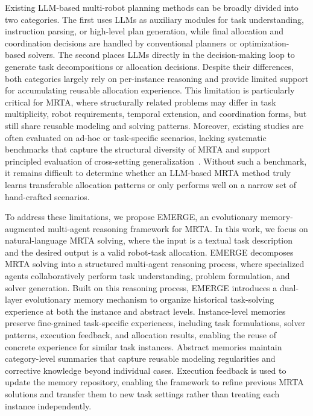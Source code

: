 \documentclass[letterpaper,journal]{IEEEtran}
\begin{document}
Existing LLM-based multi-robot planning methods can be broadly divided into two categories. The first uses LLMs as auxiliary modules for task understanding, instruction parsing, or high-level plan generation, while final allocation and coordination decisions are handled by conventional planners or optimization-based solvers\cite{yu2025clga}. The second places LLMs directly in the decision-making loop to generate task decompositions or allocation decisions\cite{kannan2024smart}. Despite their differences, both categories largely rely on per-instance reasoning and provide limited support for accumulating reusable allocation experience. This limitation is particularly critical for MRTA, where structurally related problems may differ in task multiplicity, robot requirements, temporal extension, and coordination forms, but still share reusable modeling and solving patterns. Moreover, existing studies are often evaluated on ad-hoc or task-specific scenarios, lacking systematic benchmarks that capture the structural diversity of MRTA and support principled evaluation of cross-setting generalization~\cite{yu2025clga,kannan2024smart}. Without such a benchmark, it remains difficult to determine whether an LLM-based MRTA method truly learns transferable allocation patterns or only performs well on a narrow set of hand-crafted scenarios.

\IEEEpubidadjcol
To address these limitations, we propose EMERGE, an evolutionary memory-augmented multi-agent reasoning framework for MRTA. In this work, we focus on natural-language MRTA solving, where the input is a textual task description and the desired output is a valid robot-task allocation. EMERGE decomposes MRTA solving into a structured multi-agent reasoning process, where specialized agents collaboratively perform task understanding, problem formulation, and solver generation. Built on this reasoning process, EMERGE introduces a dual-layer evolutionary memory mechanism to organize historical task-solving experience at both the instance and abstract levels. Instance-level memories preserve fine-grained task-specific experiences, including task formulations, solver patterns, execution feedback, and allocation results, enabling the reuse of concrete experience for similar task instances. Abstract memories maintain category-level summaries that capture reusable modeling regularities and corrective knowledge beyond individual cases. Execution feedback is used to update the memory repository, enabling the framework to refine previous MRTA solutions and transfer them to new task settings rather than treating each instance independently.
\end{document}
